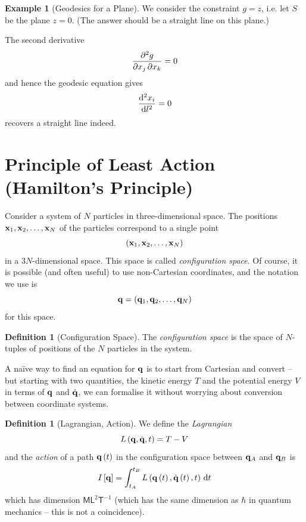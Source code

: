 \documentclass[11pt]{article}
\numberwithin{equation}{section}
\theoremstyle{definition}
\newtheorem{definition}[theorem]{Definition}
\newtheorem{example}[theorem]{Example}
\theoremstyle{remark}
\newcommand{\pqty}[1]{\left(#1\right)}
\newcommand{\bqty}[1]{\left[#1\right]}
\newcommand{\dimM}{\mathsf M}
\newcommand{\dimL}{\mathsf L}
\newcommand{\dimT}{\mathsf T}
\begin{document}
\begin{example}[Geodesics for a Plane]\label{variation-unit-0056}
    We consider the constraint \(g = z\), i.e. let \(S\) be the plane \(z = 0\). (The answer should be a straight line on this plane.)

    The second derivative
    \[
        \pdv{g}{x_j}{x_k} = 0
    \]
    and hence the geodesic equation gives
    \[
        \dv[2]{x_i}{l} = 0
    \]
    recovers a straight line indeed.
\end{example}

\section{Principle of Least Action (Hamilton's Principle)}

Consider a system of \(N\) particles in three-dimensional space. The positions \(\vb{x}_1, \vb{x}_2, \ldots, \vb{x}_N\) of the particles correspond to a single point
\[
    \pqty{\vb{x}_1, \vb{x}_2, \ldots, \vb{x}_N}
\]
in a \(3N\)-dimensional space. This space is called \emph{configuration space}. Of course, it is possible (and often useful) to use non-Cartesian coordinates, and the notation we use is
\[
    \vb{q} = \pqty{\vb{q}_1, \vb{q}_2, \ldots, \vb{q}_N}
\]
for this space.

\begin{definition}[Configuration Space]\label{variation-unit-0057}
    The \emph{configuration space} is the space of \(N\)-tuples of positions of the \(N\) particles in the system.
\end{definition}

A na\"ive way to find an equation for \(\vb{q}\) is to start from Cartesian and convert -- but starting with two quantities, the kinetic energy \(T\) and the potential energy \(V\) in terms of \(\vb{q}\) and \(\dot{\vb{q}}\), we can formalise it without worrying about conversion between coordinate systems.

\begin{definition}[Lagrangian, Action]\label{variation-unit-0058}
    We define the \emph{Lagrangian}
    \begin{equation}
        \label{eq:lagrangian}%
        L \pqty{\vb{q}, \dot{\vb{q}}, t} = T - V
    \end{equation}
    and the \emph{action} of a path \(\vb{q}\pqty{t}\) in the configuration space between \(\vb{q}_{A}\) and \(\vb{q}_{B}\) is
    \[
        I \bqty{\vb{q}} = \int_{t_A}^{t_B} L \pqty{\vb{q}\pqty{t}, \dot{\vb{q}} \pqty{t}, t} \dd{t}
    \]
    which has dimension \(\dimM \dimL^2 \dimT^{-1}\) (which has the same dimension as \(\hbar\) in quantum mechanics -- this is not a coincidence).
\end{definition}
\end{document}
